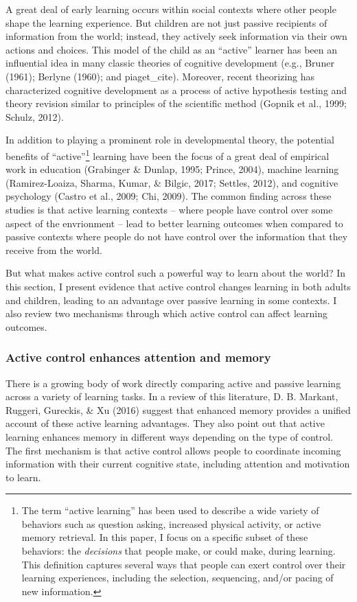 \documentclass[a4paper,man,apacite,floatsintext]{apa6}
\begin{document}
A great deal of early learning occurs within social contexts where other
people shape the learning experience. But children are not just passive
recipients of information from the world; instead, they actively seek
information via their own actions and choices. This model of the child
as an ``active'' learner has been an influential idea in many classic
theories of cognitive development (e.g., Bruner (1961); Berlyne (1960);
and piaget\_cite). Moreover, recent theorizing has characterized
cognitive development as a process of active hypothesis testing and
theory revision similar to principles of the scientific method (Gopnik
et al., 1999; Schulz, 2012).

In addition to playing a prominent role in developmental theory, the
potential benefits of ``active''\footnote{The term ``active learning''
  has been used to describe a wide variety of behaviors such as question
  asking, increased physical activity, or active memory retrieval. In
  this paper, I focus on a specific subset of these behaviors: the
  \emph{decisions} that people make, or could make, during learning.
  This definition captures several ways that people can exert control
  over their learning experiences, including the selection, sequencing,
  and/or pacing of new information.} learning have been the focus of a
great deal of empirical work in education (Grabinger \& Dunlap, 1995;
Prince, 2004), machine learning (Ramirez-Loaiza, Sharma, Kumar, \&
Bilgic, 2017; Settles, 2012), and cognitive psychology (Castro et al.,
2009; Chi, 2009). The common finding across these studies is that active
learning contexts -- where people have control over some aspect of the
envrionment -- lead to better learning outcomes when compared to passive
contexts where people do not have control over the information that they
receive from the world.

But what makes active control such a powerful way to learn about the
world? In this section, I present evidence that active control changes
learning in both adults and children, leading to an advantage over
passive learning in some contexts. I also review two mechanisms through
which active control can affect learning outcomes.

\subsubsection{Active control enhances attention and
memory}\label{active-control-enhances-attention-and-memory}

There is a growing body of work directly comparing active and passive
learning across a variety of learning tasks. In a review of this
literature, D. B. Markant, Ruggeri, Gureckis, \& Xu (2016) suggest that
enhanced memory provides a unified account of these active learning
advantages. They also point out that active learning enhances memory in
different ways depending on the type of control. The first mechanism is
that active control allows people to coordinate incoming information
with their current cognitive state, including attention and motivation
to learn.
\end{document}

